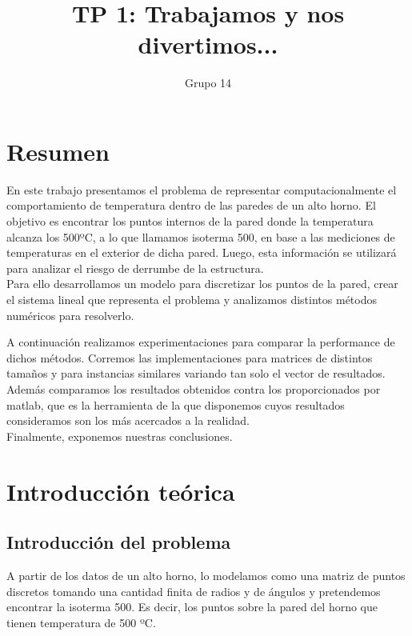 \documentclass[12pt,a4paper]{article}
\author{Grupo 14}
\date{}
\title{TP 1: Trabajamos y nos divertimos...}
\begin{document}
\lstset{language=C++, breaklines}

\maketitle

\tableofcontents

\pagebreak

\section*{\centering Resumen}

En este trabajo presentamos el problema de representar computacionalmente el comportamiento de temperatura dentro de las paredes de un alto horno. El objetivo es encontrar los puntos internos de la pared donde la temperatura alcanza los 500ºC, a lo que llamamos isoterma 500, en base a las mediciones de temperaturas en el exterior de dicha pared. Luego, esta información se utilizará para analizar el riesgo de derrumbe de la estructura.\\
Para ello desarrollamos un modelo para discretizar los puntos de la pared, crear el sistema lineal que representa el problema y analizamos distintos métodos numéricos para resolverlo.

A continuación realizamos experimentaciones para comparar la performance de dichos métodos. Corremos las implementaciones para matrices de distintos tamaños y para instancias similares variando tan solo el vector de resultados. Además comparamos los resultados obtenidos contra los proporcionados por matlab, que es la herramienta de la que disponemos cuyos resultados consideramos son los más acercados a la realidad.\\ 
Finalmente, exponemos nuestras conclusiones.

\section{Introducción teórica}

\subsection{Introducción del problema}

A partir de los datos de un alto horno, lo modelamos como una matriz de puntos discretos tomando una cantidad finita de radios y de ángulos y pretendemos encontrar la isoterma 500. Es decir, los puntos sobre la pared del horno que tienen temperatura de 500 ºC.
\end{document}
